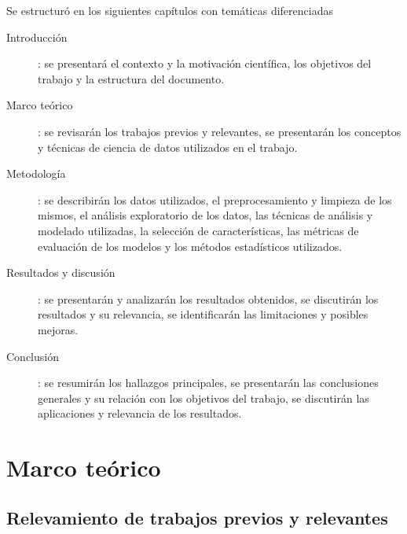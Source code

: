 \documentclass[a4paper]{report}
\begin{document}
Se estructuró en los siguientes capítulos con temáticas diferenciadas
\begin{description}
	\item[Introducción]: se presentará el contexto y la motivación científica, los objetivos del trabajo y la estructura del documento.
	\item[Marco teórico]: se revisarán los trabajos previos y relevantes, se presentarán los conceptos y técnicas de ciencia de datos utilizados en el trabajo.
	\item[Metodología]: se describirán los datos utilizados, el preprocesamiento y limpieza de los mismos, el análisis exploratorio de los datos, las técnicas de análisis y modelado utilizadas, la selección de características, las métricas de evaluación de los modelos y los métodos estadísticos utilizados.
	\item[Resultados y discusión]: se presentarán y analizarán los resultados obtenidos, se discutirán los resultados y su relevancia, se identificarán las limitaciones y posibles mejoras.
	\item[Conclusión]: se resumirán los hallazgos principales, se presentarán las conclusiones generales y su relación con los objetivos del trabajo, se discutirán las aplicaciones y relevancia de los resultados.
\end{description}



\chapter{Marco teórico}


\section{Relevamiento de trabajos previos y relevantes}
\end{document}
